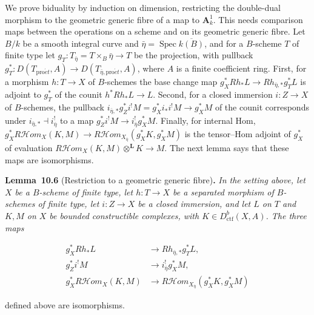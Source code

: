 \documentclass[11pt]{article}
\newenvironment{bpstatement}[2]{\par\addvspace{0.6\baselineskip}\noindent\textbf{#1}#2\textbf{.}\enspace\ignorespaces}
  {\par\addvspace{0.4\baselineskip}}
\newenvironment{bpstatementit}[2]{\begin{bpstatement}{#1}{#2}\itshape\ignorespaces}{\end{bpstatement}}
\providecommand{\cHom}{}\renewcommand{\cHom}{R\mathcal{H}\!om}
\begin{document}
\label{bp18}%
We prove biduality by induction on dimension, restricting the double-dual morphism to the geometric generic fibre of a map to \(\mathbf A^1_k\). This needs comparison maps between the operations on a scheme and on its geometric generic fibre. Let \(B/k\) be a smooth integral curve and \(\bar\eta=\operatorname{Spec}\overline{k(B)}\), and for a \(B\)-scheme \(T\) of finite type let \(g_T:T_{\bar\eta}=T\times_B\bar\eta\to T\) be the projection, with pullback \(g_T^*:D(T_{\mathrm{pro}\acute{e}t},A)\to D(T_{\bar\eta,\mathrm{pro}\acute{e}t},A)\), where \(A\) is a finite coefficient ring. First, for a morphism \(h:T\to X\) of \(B\)-schemes the base change map \(g_X^*Rh_*L\to Rh_{\bar\eta,*}g_T^*L\) is adjoint to \(g_T^*\) of the counit \(h^*Rh_*L\to L\). Second, for a closed immersion \(i:Z\to X\) of \(B\)-schemes, the pullback \(i_{\bar\eta,*}g_Z^*i^!M=g_X^*i_*i^!M\to g_X^*M\) of the counit corresponds under \(i_{\bar\eta,*}\dashv i_{\bar\eta}^!\) to a map \(g_Z^*i^!M\to i_{\bar\eta}^!g_X^*M\). Finally, for internal Hom, \(g_X^*\cHom_X(K,M)\to\cHom_{X_{\bar\eta}}(g_X^*K,g_X^*M)\) is the tensor–Hom adjoint of \(g_X^*\) of evaluation \(\cHom_X(K,M)\otimes^{\mathbf L}K\to M\). The next lemma says that these maps are isomorphisms.

\label{bp19}%
\begin{bpstatementit}{Lemma~10.6}{ (Restriction to a geometric generic fibre)}
In the setting above, let \(X\) be a \(B\)-scheme of finite type, let \(h:T\to X\) be a separated morphism of \(B\)-schemes of finite type, let \(i:Z\to X\) be a closed immersion, and let \(L\) on \(T\) and \(K,M\) on \(X\) be bounded constructible complexes, with \(K\in D^b_{\mathrm{ctf}}(X,A)\). The three maps

\[
\begin{aligned}
g_X^*Rh_*L&\longrightarrow Rh_{\bar\eta,*}g_T^*L,\\
g_Z^*i^!M&\longrightarrow i_{\bar\eta}^!g_X^*M,\\
g_X^*\cHom_X(K,M)&\longrightarrow
\cHom_{X_{\bar\eta}}(g_X^*K,g_X^*M)
\end{aligned}
\]

defined above are isomorphisms.
\end{bpstatementit}
\end{document}

